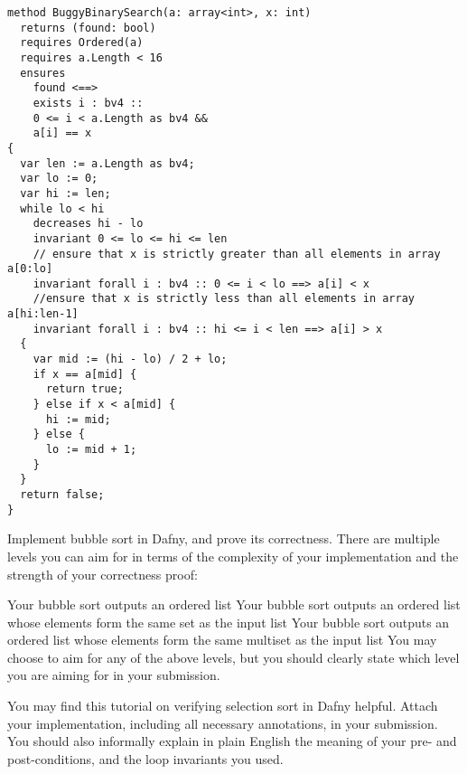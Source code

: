 \documentclass{jhwhw}
\begin{document}
\begin{lstlisting}
method BuggyBinarySearch(a: array<int>, x: int)
  returns (found: bool)
  requires Ordered(a)
  requires a.Length < 16
  ensures
    found <==>
    exists i : bv4 ::
    0 <= i < a.Length as bv4 &&
    a[i] == x
{
  var len := a.Length as bv4;
  var lo := 0;
  var hi := len;
  while lo < hi
    decreases hi - lo
    invariant 0 <= lo <= hi <= len
    // ensure that x is strictly greater than all elements in array a[0:lo]
    invariant forall i : bv4 :: 0 <= i < lo ==> a[i] < x
    //ensure that x is strictly less than all elements in array a[hi:len-1]
    invariant forall i : bv4 :: hi <= i < len ==> a[i] > x
  {
    var mid := (hi - lo) / 2 + lo;
    if x == a[mid] {
      return true;
    } else if x < a[mid] {
      hi := mid;
    } else {
      lo := mid + 1;
    }
  }
  return false;
}
\end{lstlisting}

Implement bubble sort in Dafny, and prove its correctness. There are multiple levels you can aim for in terms of the complexity of your implementation and the strength of your correctness proof:


Your bubble sort outputs an ordered list
Your bubble sort outputs an ordered list whose elements form the same set as the input list
Your bubble sort outputs an ordered list whose elements form the same multiset as the input list
You may choose to aim for any of the above levels, but you should clearly state which level you are aiming for in your submission.


You may find this tutorial on verifying selection sort in Dafny helpful.
\newline\newline
Attach your implementation, including all necessary annotations, in your submission. You should also informally explain in plain English the meaning of your pre- and post-conditions, and the loop invariants you used.
\solution
\end{document}
